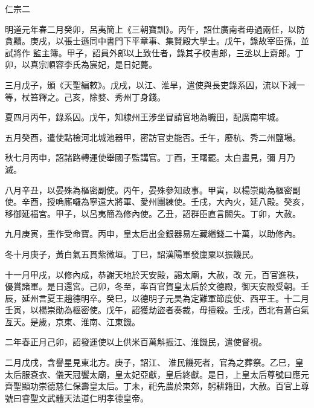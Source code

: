 
\begin{pinyinscope}

 仁宗二



 明道元年春二月癸卯，呂夷簡上《三朝寶訓》。丙午，詔仕廣南者毋過兩任，以防貪黷。庚戌，以張士遜同中書門下平章事、集賢殿大學士。戊午，錄故宰臣孫，並試將作
 監主簿。甲子，詔員外郎以上致仕者，錄其子校書郎，三丞以上齋郎。丁卯，以真宗順容李氏為宸妃，是日妃薨。



 三月戊子，頒《天聖編敕》。戊戌，以江、淮旱，遣使與長吏錄系囚，流以下減一等，杖笞釋之。己亥，除婺、秀州丁身錢。



 夏四月丙午，錄系囚。戊午，知棣州王涉坐冒請官地為職田，配廣南牢城。



 五月癸酉，遣使點檢河北城池器甲，密訪官吏能否。壬午，廢杭、秀二州鹽場。



 秋七月丙申，詔諸路轉運使舉國子監講官。丁酉，王曙罷。太白晝見，彌
 月乃滅。



 八月辛丑，以晏殊為樞密副使。丙午，晏殊參知政事。甲寅，以楊崇勛為樞密副使。辛酉，授唃廝囉為寧遠大將軍、愛州團練使。壬戌，大內火，延八殿。癸亥，移御延福宮。甲子，以呂夷簡為修內使。乙丑，詔群臣直言闕失。丁卯，大赦。



 九月庚寅，重作受命寶。丙申，皇太后出金銀器易左藏緡錢二十萬，以助修內。



 冬十月庚子，黃白氣五貫紫微垣。丁巳，詔漢陽軍發廩粟以振饑民。



 十一月甲戌，以修內成，恭謝天地於天安殿，謁太廟，大赦，改
 元，百官進秩，優賞諸軍。是日還宮。己卯，冬至，率百官賀皇太后於文德殿，御天安殿受朝。壬辰，延州言夏王趙德明卒。癸巳，以德明子元昊為定難軍節度使、西平王。十二月壬寅，以楊崇勛為樞密使。戊午，詔獲劫盜者奏裁，毋擅殺。壬戌，西北有蒼白氣亙天。是歲，京東、淮南、江東饑。



 二年春正月己卯，詔發運使以上供米百萬斛振江、淮饑民，遣使督視。



 二月戊戌，含譽星見東北方。庚子，詔江、
 淮民饑死者，官為之葬祭。乙巳，皇太后服袞衣、儀天冠饗太廟，皇太妃亞獻，皇后終獻。是日，上皇太后尊號曰應元齊聖顯功崇德慈仁保壽皇太后。丁未，祀先農於東郊，躬耕籍田，大赦。百官上尊號曰睿聖文武體天法道仁明孝德皇帝。




\end{pinyinscope}
